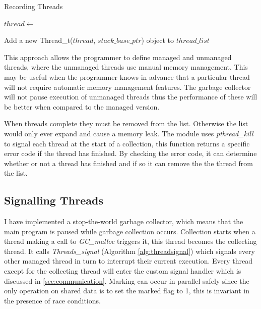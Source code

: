 \documentclass[../diss.tex]{subfiles}
\begin{document}
\begin{algorithm}
\caption{Recording Threads}
\label{alg:threadsaddexplicit}
\begin{algorithmic}


\State $thread\gets $ 

\State
\State {}

\State Add a new Thread\_t($thread$, $stack\_base\_ptr$) object to $thread\_list$

\State {}

\EndFunction

\end{algorithmic}
\end{algorithm}

This approach allows the programmer to define managed and unmanaged threads, where the unmanaged threads use manual memory management. This may be useful when the programmer knows in advance that a particular thread will not require automatic memory management features. The garbage collector will not pause execution of unmanaged threads thus the performance of these will be better when compared to the managed version.

When threads complete they must be removed from the list. Otherwise the list would only ever expand and cause a memory leak. The module uses \emph{pthread\_kill} to signal each thread at the start of a collection, this function returns a specific error code if the thread has finished. By checking the error code, it can determine whether or not a thread has finished and if so it can remove the the thread from the list. 

\subsection{Signalling Threads} \label{sec:signallingthreads}

I have implemented a stop-the-world garbage collector, which means that the main program is paused while garbage collection occurs. Collection starts when a thread making a call to \emph{GC\_malloc} triggers it, this thread becomes the collecting thread. It calls \emph{Threads\_signal} (Algorithm \ref{alg:threadsignal}) which signals every other managed thread in turn to interrupt their current execution. Every thread except for the collecting thread will enter the custom signal handler which is discussed in \cref{sec:communication}. Marking can occur in parallel safely since the only operation on shared data is to set the marked flag to 1, this is invariant in the presence of race conditions.
\end{document}
